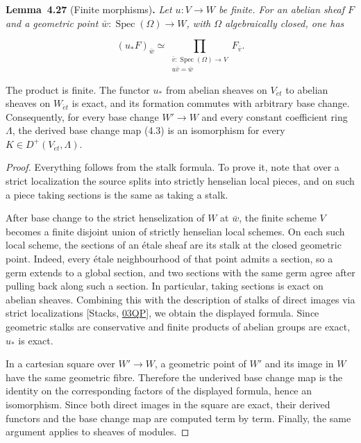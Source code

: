\documentclass[11pt]{article}
\newenvironment{bpstatement}[2]{\par\addvspace{0.6\baselineskip}\noindent\textbf{#1}#2\textbf{.}\enspace\ignorespaces}
  {\par\addvspace{0.4\baselineskip}}
\newenvironment{bpstatementit}[2]{\begin{bpstatement}{#1}{#2}\itshape\ignorespaces}{\end{bpstatement}}
\begin{document}
\label{bp364}%
\begin{bpstatementit}{Lemma~4.27}{ (Finite morphisms)}
Let \(u:V\to W\) be finite. For an abelian sheaf \(F\) and a geometric point \(\bar w:\operatorname{Spec}(\Omega)\to W\), with \(\Omega\) algebraically closed, one has

\[
(u_*F)_{\bar w}
\simeq \prod_{\substack{\bar v:\operatorname{Spec}(\Omega)\to V\\
u\bar v=\bar w}}F_{\bar v}.
\]

The product is finite. The functor \(u_*\) from abelian sheaves on \(V_{\acute{e}t}\) to abelian sheaves on \(W_{\acute{e}t}\) is exact, and its formation commutes with arbitrary base change. Consequently, for every base change \(W'\to W\) and every constant coefficient ring \(\Lambda\), the derived base change map (4.3) is an isomorphism for every \(K\in D^+(V_{\acute{e}t},\Lambda)\).
\end{bpstatementit}

\begin{proof}[{Proof}]\label{bp365}%
Everything follows from the stalk formula. To prove it, note that over a strict localization the source splits into strictly henselian local pieces, and on such a piece taking sections is the same as taking a stalk.

After base change to the strict henselization of \(W\) at \(\bar w\), the finite scheme \(V\) becomes a finite disjoint union of strictly henselian local schemes. On each such local scheme, the sections of an étale sheaf are its stalk at the closed geometric point. Indeed, every étale neighbourhood of that point admits a section, so a germ extends to a global section, and two sections with the same germ agree after pulling back along such a section. In particular, taking sections is exact on abelian sheaves. Combining this with the description of stalks of direct images via strict localizations [Stacks, \href{https://stacks.math.columbia.edu/tag/03QP}{03QP}], we obtain the displayed formula. Since geometric stalks are conservative and finite products of abelian groups are exact, \(u_*\) is exact.

In a cartesian square over \(W'\to W\), a geometric point of \(W'\) and its image in \(W\) have the same geometric fibre. Therefore the underived base change map is the identity on the corresponding factors of the displayed formula, hence an isomorphism. Since both direct images in the square are exact, their derived functors and the base change map are computed term by term. Finally, the same argument applies to sheaves of modules.
\end{proof}
\end{document}
